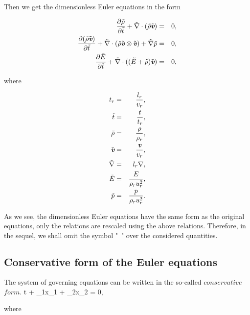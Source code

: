 Then we get the dimensionless Euler equations in the form

\begin{eqnarray}
{\partial\tilde\rho\over\partial \tilde t} + \tilde\nabla\cdot(\tilde\rho \tilde{\textit{\textbf{v}}}) & = & 0,  \\ {\partial(\tilde \rho\tilde{\textit{\textbf{v}}})\over\partial \tilde t} + \tilde\nabla\cdot(\tilde\rho\tilde{\textit{\textbf{v}}}\otimes\tilde{\textit{\textbf{v}}}) + \tilde\nabla\tilde p & = &  0, \\ {\partial\tilde E\over\partial\tilde t} + \tilde\nabla\cdot( (\tilde E+\tilde p)\tilde{\textit{\textbf{v}}}) & = &  0,
\end{eqnarray}

where

\begin{eqnarray}
t_r & = & {l_r\over v_r},\\
\tilde t & = &  {t\over t_r},\\
\tilde \rho & = &  {\rho\over\rho_r},\\
\tilde{\textit{\textbf{v}}} & = &  {{\textit{\textbf{v}}}\over v_r},\\
\tilde\nabla & = &  l_r\nabla,\\
\tilde E & = &  {E\over \rho_r u^2_r},\\
\tilde p & = &  {p\over \rho_r u^2_r}.
\end{eqnarray}

As we see, the dimensionless Euler equations have the same form as the original equations, only the relations are rescaled using the above relations. Therefore, in the sequel, we shall omit the symbol "~" over the considered quantities.

\subsection{Conservative form of the Euler equations}
The system of governing equations can be written in the so-called $conservative$ $form$.
\be
\label{conservative_form}
{\partial{}\over \partial t} + {_1\over \partial x_1} + {_2\over \partial x_2} = 0,
\ee

where

